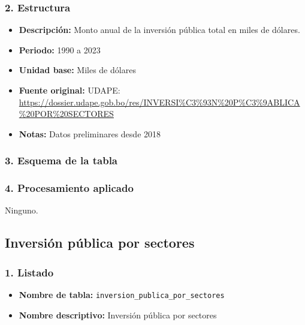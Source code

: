 \documentclass[12pt,a4paper]{article}
\begin{document}
\subsubsection*{2. Estructura}
\begin{itemize}
  \item \textbf{Descripción:} Monto anual de la inversión pública total en miles de dólares.
  \item \textbf{Periodo:} 1990 a 2023
  \item \textbf{Unidad base:} Miles de dólares
  \item \textbf{Fuente original:} UDAPE:\\
    \url{https://dossier.udape.gob.bo/res/INVERSI%C3%93N%20P%C3%9ABLICA%20POR%20SECTORES}
  \item \textbf{Notas:} Datos preliminares desde 2018
\end{itemize}

\subsubsection*{3. Esquema de la tabla}

\subsubsection*{4. Procesamiento aplicado}
Ninguno.

\subsection{Inversión pública por sectores}

\subsubsection*{1. Listado}
\begin{itemize}
  \item \textbf{Nombre de tabla:} \texttt{inversion\_publica\_por\_sectores}
  \item \textbf{Nombre descriptivo:} Inversión pública por sectores
\end{itemize}
\end{document}
